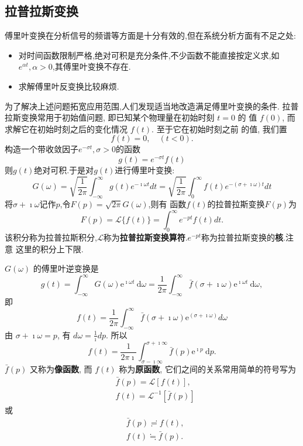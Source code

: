 \subsection{拉普拉斯变换}
\label{subsec:laplace_transform}

傅里叶变换在分析信号的频谱等方面是十分有效的,但在系统分析方面有不足之处:

\begin{itemize}
    \item 对时间函数限制严格,绝对可积是充分条件,不少函数不能直接按定义求,如$e^{\alpha t}, \alpha > 0$,其傅里叶变换不存在.

    \item  求解傅里叶反变换比较麻烦.
\end{itemize}
为了解决上述问题拓宽应用范围,人们发现适当地改造满足傅里叶变换的条件.
拉普拉斯变换常用于初始值问题, 即已知某个物理量在初始时刻 $t=0$ 的 值 $f(0)$, 而求解它在初始时刻之后的变化情况 $f(t)$.
 至于它在初始时刻之前 的值, 我们置
$$
f(t)=0, \quad(t<0) .
$$
构造一个带收敛因子$e^{-\sigma t}, \sigma > 0$的函数
$$
g(t) =e^{-\sigma t} f(t)
$$
则$g(t)$绝对可积.于是对$g(t)$进行傅里叶变换:
\begin{equation}
    G(\omega) = \sqrt{\frac{1}{2\pi} } \int_{-\infty}^{\infty} g(t) e^{-\imath \omega t} dt 
    = \sqrt{\frac{1}{2\pi} } \int_{0}^{\infty} f(t) e^{-(\sigma + \imath \omega) t} dt  
\end{equation}
将$\sigma + \imath \omega$记作$p$,令$F(p)=\sqrt{2\pi}G(\omega)$,则有
函数$f(t)$的拉普拉斯变换$F(p)$为
\begin{equation}
    F(p) = \mathcal{L} \{ f(t) \} = \int_0 ^{\infty} e^{-pt} f(t) dt .
\end{equation}
该积分称为拉普拉斯积分,$\mathcal{L}$称为\textbf{拉普拉斯变换算符}.$e^{-pt}$称为拉普拉斯变换的\textbf{核}.注意
这里的积分上下限.

$G(\omega)$ 的傅里叶逆变换是
$$
g(t)=\int_{-\infty}^{\infty} G(\omega) \mathrm{e}^{\imath \omega t} \mathrm{~d} \omega=\frac{1}{2 \pi} \int_{-\infty}^{\infty} \bar{f}(\sigma+\imath \omega) \mathrm{e}^{\imath \omega t} \mathrm{~d} \omega,
$$
即
$$
f(t)=\frac{1}{2 \pi} \int_{-\infty}^{\infty} \bar{f}(\sigma+\imath \omega) \mathrm{e}^{(\sigma+\imath \omega)} d \omega
$$
由 $\sigma+\imath \omega=p$, 有 $d \omega=\frac{1}{\imath} d p$. 所以
$$
f(t)=\frac{1}{2 \pi \imath} \int_{\sigma-\imath \infty}^{\sigma+\imath \infty} \bar{f}(p) \mathrm{e}^{\imath p} \mathrm{~d} p .
$$
$\bar{f}(p)$ 又称为\textbf{像函数}, 而 $f(t)$ 称为\textbf{原函数}, 它们之间的关系常用简单的符号写为
$$
\begin{aligned}
& \bar{f}(p)=\mathcal{L}[f(t)], \\
& f(t)=\mathcal{L}^{-1}[\bar{f}(p)]
\end{aligned}
$$
或
$$
\begin{aligned}
& \bar{f}(p) \risingdotseq f(t), \\
& f(t) \fallingdotseq \bar{f}(p) .
\end{aligned}
$$

